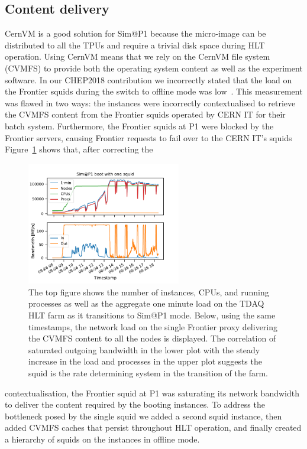 \documentclass{webofc}
\begin{document}
\subsection{Content delivery}
CernVM is a good solution for Sim@P1 because the micro-image can be distributed
to all the TPUs and require a trivial disk space during HLT operation. Using
CernVM means that we rely on the CernVM file system (CVMFS) to provide both the
operating system content as well as the experiment software. In our CHEP2018
contribution we incorrectly stated that the load on the Frontier
squids during the switch to offline mode was low~\cite{Berghaus:2019wuj}.
This measurement was flawed in two ways: the instances were incorrectly
contextualised to retrieve the CVMFS content from the Frontier squids operated
by CERN IT for their batch system. Furthermore, the Frontier squids at P1 were
blocked by the Frontier servers, causing Frontier requests to fail over to the
CERN IT's squids Figure~\ref{fig:single_proxy} shows that, after correcting the
\begin{figure}[h]
\centering
\sidecaption
\includegraphics[width=0.6\textwidth,clip]{single_squid}
\caption{The top figure shows the number of instances, CPUs, and running
processes as well as the aggregate one minute load on the TDAQ HLT farm as it
transitions to Sim@P1 mode. Below, using the same timestamps, the network load
on the single Frontier proxy delivering the CVMFS content to all the nodes is
displayed. The correlation of saturated outgoing bandwidth in the lower plot
with
the steady increase in the load and processes in the upper plot suggests the
squid is the rate determining system in the transition of the farm.}
\label{fig:single_proxy}
\end{figure}
contextualisation, the Frontier squid at P1 was saturating its network bandwidth
to deliver the content required by the booting instances. To address the
bottleneck posed by the single squid we added a second squid instance,
then added CVMFS caches that persist throughout HLT operation, and finally
created
a hierarchy of squids on the instances in offline mode.
\end{document}
